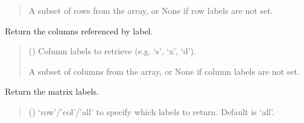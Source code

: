 \documentclass[letterpaper,12pt,english]{sphinxmanual}
\begin{document}
\begin{fulllineitems}
\begin{fulllineitems}
\begin{quote}
\begin{description}
\sphinxAtStartPar
{} \textendash{} A subset of rows from the array, or None if row labels are not set.

\end{description}\end{quote}

\end{fulllineitems}


\begin{fulllineitems}
\label{\detokenize{api/core:cbmpy.CBCommon.StructMatrix.getColsByName}}
\pysigstartsignatures
\pysiglinewithargsret
{}
{}
{}
\pysigstopsignatures
\sphinxAtStartPar
Return the columns referenced by label.
\begin{quote}\begin{description}
\sphinxAtStartPar
{} () \textendash{} Column labels to retrieve (e.g. ‘s’, ‘x’, ‘d’).

\sphinxAtStartPar
{} \textendash{} A subset of columns from the array, or None if column labels are not set.

\end{description}\end{quote}

\end{fulllineitems}


\begin{fulllineitems}
\label{\detokenize{api/core:cbmpy.CBCommon.StructMatrix.getLabels}}
\pysigstartsignatures
\pysiglinewithargsret
{}
{}
{}
\pysigstopsignatures
\sphinxAtStartPar
Return the matrix labels.
\begin{quote}\begin{description}
\sphinxAtStartPar
{} (\sphinxstyleliteralemphasis{\sphinxupquote{, }}) \textendash{} ‘row’/’col’/’all’ to specify which labels to return. Default is ‘all’.


\end{description}
\end{quote}
\end{fulllineitems}
\end{fulllineitems}
\end{document}
